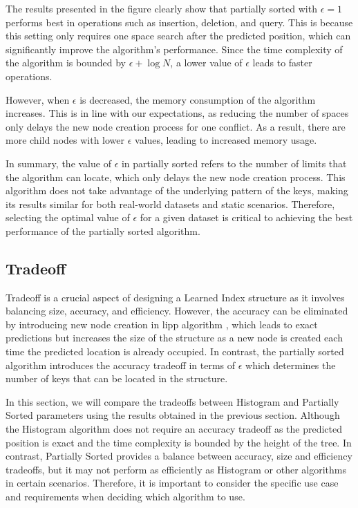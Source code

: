 \documentclass[11pt,a4paper]{article}
\newcommand{\learnindex}{\textsf{Learned Index}\xspace}
\begin{document}
The results presented in the figure clearly show that partially sorted with $\epsilon = 1$ performs best in operations such as insertion, deletion, and query. This is because this setting only requires one space search after the predicted position, which can significantly improve the algorithm's performance. Since the time complexity of the algorithm is bounded by $\epsilon+\log N$, a lower value of $\epsilon$ leads to faster operations.

However, when $\epsilon$ is decreased, the memory consumption of the algorithm increases. This is in line with our expectations, as reducing the number of spaces only delays the new node creation process for one conflict. As a result, there are more child nodes with lower $\epsilon$ values, leading to increased memory usage.

In summary, the value of $\epsilon$ in partially sorted refers to the number of limits that the algorithm can locate, which only delays the new node creation process. This algorithm does not take advantage of the underlying pattern of the keys, making its results similar for both real-world datasets and static scenarios. Therefore, selecting the optimal value of $\epsilon$ for a given dataset is critical to achieving the best performance of the partially sorted algorithm.

\subsection{Tradeoff}
Tradeoff is a crucial aspect of designing a \learnindex structure as it involves balancing size, accuracy, and efficiency. However, the accuracy can be eliminated by introducing new node creation in \acrshort{lipp} algorithm \cite{LIPP}, which leads to exact predictions but increases the size of the structure as a new node is created each time the predicted location is already occupied. In contrast, the partially sorted algorithm introduces the accuracy tradeoff in terms of $\epsilon$ which determines the number of keys that can be located in the structure.

In this section, we will compare the tradeoffs between Histogram and Partially Sorted parameters using the results obtained in the previous section. Although the Histogram algorithm does not require an accuracy tradeoff as the predicted position is exact and the time complexity is bounded by the height of the tree. In contrast, Partially Sorted provides a balance between accuracy, size and efficiency tradeoffs, but it may not perform as efficiently as Histogram or other algorithms in certain scenarios. Therefore, it is important to consider the specific use case and requirements when deciding which algorithm to use.
\end{document}
